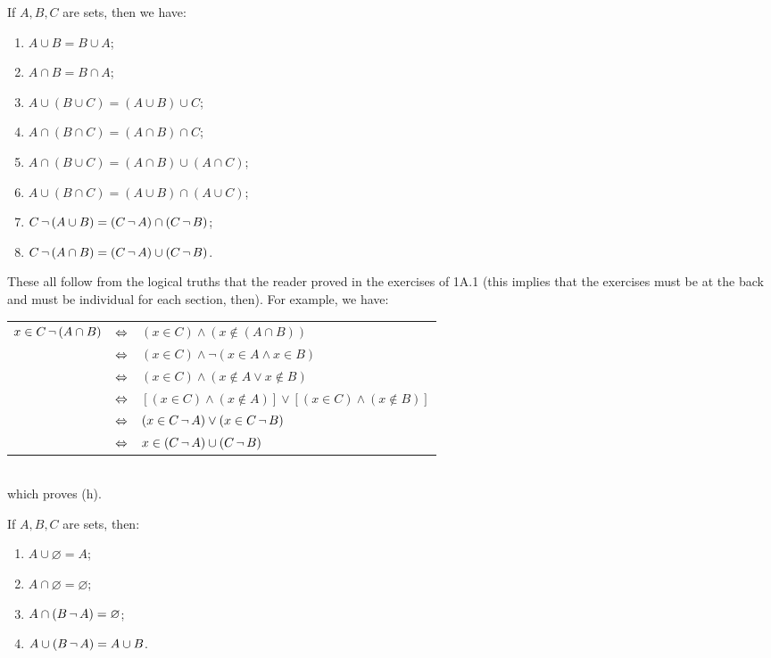 \begin{thm}
\label{Thm:_Algebra_of_Sets_part_one}
If $A, B, C$ are sets, then we have: 

\begin{enumerate}[label=(\alph*)]
\item $A\cup B = B\cup A$;
\item $A\cap B = B\cap A$; 
\item $A\cup (B\cup C) = (A\cup B)\cup C$;
\item $A\cap (B\cap C) = (A\cap B)\cap C$; 
\item $A\cap(B\cup C) = (A\cap B)\cup(A\cap C)$; 
\item $A\cup (B\cap C) = (A \cup B)\cap (A\cup C)$; 
\item $C\, \lnot \, (A\cup B) = (C\, \lnot \, A)\cap (C\, \lnot \, B)$; 
\item $C\, \lnot \, (A\cap B) = (C\, \lnot \, A)\cup (C\, \lnot \, B)$.
\end{enumerate}
\end{thm}

\begin{prf}
These all follow from the logical truths that the reader proved in the exercises of 1A.1 (this implies that the exercises must be at the back and must be individual for each section, then). For example, we have: \\

\begin{tabular}{lll}
 $x\in C\, \lnot \,(A\cap B)$ & $\Leftrightarrow$ & $(x\in C)\land (x\notin (A\cap B))$ \\ 
  & $\Leftrightarrow$ & $(x\in C)\land\lnot (x\in A \land x\in B)$ \\ 
  & $\Leftrightarrow$ & $(x\in C)\land(x\notin A\lor x\notin B)$ \\
  & $\Leftrightarrow$ & $[(x\in C)\land(x\notin A)]\lor[(x\in C)\land(x\notin B)]$ \\
  & $\Leftrightarrow$ &  $(x\in C\, \lnot \, A)\lor (x\in C\, \lnot \, B)$ \\
  & $\Leftrightarrow$ & $x\in (C\, \lnot \, A)\cup (C\, \lnot \, B)$
\end{tabular} \\

which proves (h).
\end{prf}

\begin{thm}
\label{Thm:_Algebra_of_Sets_part_two}
If $A, B, C$ are sets, then: 

\begin{enumerate}[label = (\alph*)]
\item $A\cup \varnothing = A$; 
\item $A\cap \varnothing = \varnothing$; 
\item $A\cap (B\, \lnot \, A) = \varnothing$; 
\item $A\cup (B\, \lnot \, A) = A\cup B$.
\end{enumerate}
\end{thm}

